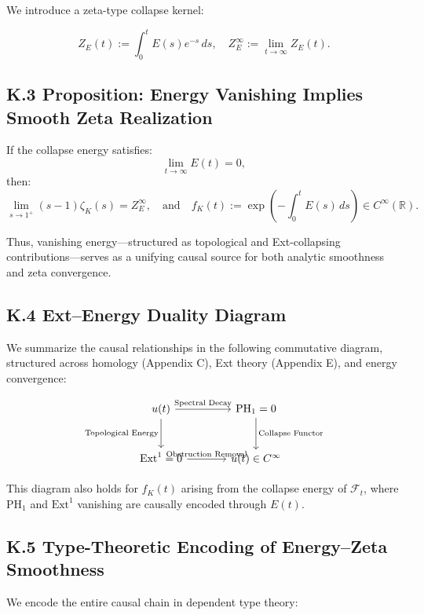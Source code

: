 \documentclass[11pt]{article}
\begin{document}
We introduce a zeta-type collapse kernel:

\[
Z_E(t) := \int_0^t E(s) e^{-s} \, ds,
\quad
Z_E^\infty := \lim_{t \to \infty} Z_E(t).
\]

\subsection*{K.3 Proposition: Energy Vanishing Implies Smooth Zeta Realization}

\begin{proposition}
\label{prop:energy-zeta}
If the collapse energy satisfies:
\[
\lim_{t \to \infty} E(t) = 0,
\]
then:
\[
\lim_{s \to 1^+} (s-1)\zeta_K(s) = Z_E^\infty,
\quad \text{and} \quad f_K(t) := \exp\left(-\int_0^t E(s) \, ds\right) \in C^\infty(\mathbb{R}).
\]
\end{proposition}

\noindent
Thus, vanishing energy—structured as topological and Ext-collapsing contributions—serves as a unifying causal source for both analytic smoothness and zeta convergence.

\subsection*{K.4 Ext–Energy Duality Diagram}

We summarize the causal relationships in the following commutative diagram, structured across homology (Appendix C), Ext theory (Appendix E), and energy convergence:

\[
\begin{tikzcd}[row sep=large, column sep=large]
u(t) \arrow[r, "\text{Spectral Decay}"] \arrow[d, swap, "\text{Topological Energy}"]
& \mathrm{PH}_1 = 0 \arrow[d, "\text{Collapse Functor}"] \\
\mathrm{Ext}^1 = 0 \arrow[r, "\text{Obstruction Removal}"]
& u(t) \in C^\infty
\end{tikzcd}
\]

\noindent
This diagram also holds for $f_K(t)$ arising from the collapse energy of $\mathcal{F}_t$, where $\mathrm{PH}_1$ and $\mathrm{Ext}^1$ vanishing are causally encoded through $E(t)$.

\subsection*{K.5 Type-Theoretic Encoding of Energy–Zeta Smoothness}

We encode the entire causal chain in dependent type theory:
\end{document}

